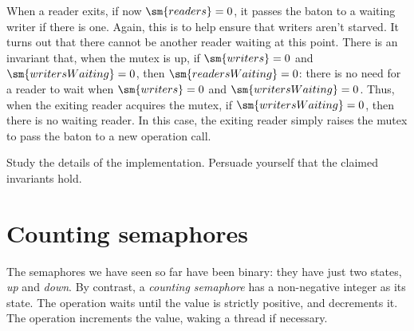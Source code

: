 When a reader exits, if now $\sm{readers} = 0$, it passes the baton to a
waiting writer if there is one.  Again, this is to help ensure that writers
aren't starved.  It turns out that there cannot be another reader waiting at
this point.  There is an invariant that, when the mutex is up, if
$\sm{writers} = 0$ and $\sm{writersWaiting} = 0$, then $\sm{readersWaiting} =
0$: there is no need for a reader to wait when ${\sm{writers} = 0}$ and
$\sm{writersWaiting} = 0$.  Thus, when the exiting reader acquires the mutex,
if $\sm{writersWaiting} = 0$, then there is no waiting reader.  In this case,
the exiting reader simply raises the mutex to pass the baton to a new
operation call.

\begin{instruction}
Study the details of the implementation.  Persuade yourself that the claimed
invariants hold.
\end{instruction}







\section{Counting semaphores}

The semaphores we have seen so far have been binary: they have just two
states, \emph{up} and \emph{down}.  By contrast, a \emph{counting
  semaphore} has a non-negative integer as its
state.  The  operation waits until the value is
strictly positive, and decrements it.  The  operation
increments the value, waking a thread if necessary.


